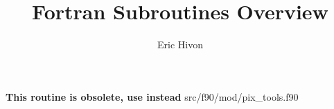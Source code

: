 
\sloppy


\title{\healpix Fortran Subroutines Overview}
 \section[getdisc\_ring]{ }
\label{sub:getdisc_ring}
\author{Eric Hivon}

\begin{facility}
{ %
{\bf This routine is obsolete, use  instead} }
{src/f90/mod/pix\_tools.f90}
\end{facility}




